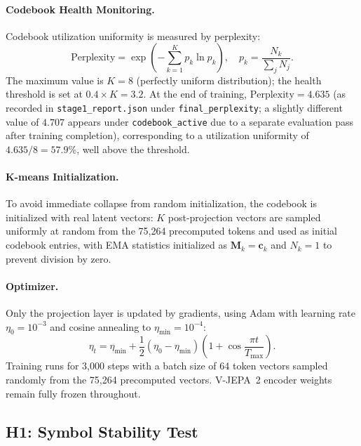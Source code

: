\documentclass{article}
\begin{document}
\paragraph{Codebook Health Monitoring.}
Codebook utilization uniformity is measured by perplexity:
%
\begin{equation}
  \text{Perplexity}
  = \exp\!\left(-\sum_{k=1}^{K} p_k \ln p_k\right),
  \quad p_k = \frac{N_k}{\sum_j N_j}.
\end{equation}
%
The maximum value is $K = 8$ (perfectly uniform distribution); the health
threshold is set at $0.4 \times K = 3.2$.  At the end of training, $\text{Perplexity} = 4.635$
(as recorded in \texttt{stage1\_report.json} under
\texttt{final\_perplexity}; a slightly different value of $4.707$
appears under \texttt{codebook\_active} due to a separate
evaluation pass after training completion), corresponding to a utilization uniformity of
$4.635/8 = 57.9\%$, well above the threshold.


\paragraph{K-means Initialization.}
To avoid immediate collapse from random initialization, the codebook is
initialized with real latent vectors: $K$ post-projection vectors are sampled
uniformly at random from the 75,264 precomputed tokens and used as initial
codebook entries, with EMA statistics initialized as $\mathbf{M}_k = \mathbf{c}_k$
and $N_k = 1$ to prevent division by zero.

\paragraph{Optimizer.}
Only the projection layer is updated by gradients, using Adam with learning rate
$\eta_0 = 10^{-3}$ and cosine annealing to $\eta_{\min} = 10^{-4}$:
%
\begin{equation}
  \eta_t
  = \eta_{\min}
  + \frac{1}{2}(\eta_0 - \eta_{\min})
    \left(1 + \cos\frac{\pi t}{T_{\max}}\right).
\end{equation}
%
Training runs for 3,000 steps with a batch size of 64 token vectors sampled
randomly from the 75,264 precomputed vectors.  V-JEPA~2 encoder weights remain
fully frozen throughout.

\subsection{H1: Symbol Stability Test}\label{sec:h1_stability}
\end{document}
